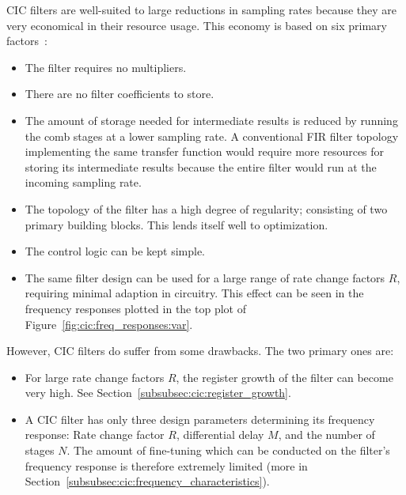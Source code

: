 CIC filters are well-suited to large reductions in sampling rates because they
are very  economical in  their resource  usage. This economy  is based  on six
primary factors~\cite{1163535}:
\begin{itemize}\tightlist
    \item
        The filter requires no multipliers.
    \item
        There are no filter coefficients to store.
    \item
        The amount  of storage needed  for intermediate results is  reduced by
        running the comb  stages at a lower sampling  rate. A conventional FIR
        filter topology implementing the  same transfer function would require
        more resources for storing its intermediate results because the entire
        filter would run at the incoming sampling rate.
    \item
        The  topology  of  the  filter   has  a  high  degree  of  regularity;
        consisting of two  primary building blocks. This lends  itself well to
        optimization.
    \item
        The control logic can be kept simple.
    \item
        The same filter  design can be used  for a large range  of rate change
        factors $R$, requiring minimal  adaption in circuitry. This effect can
        be  seen  in the  frequency  responses  plotted  in  the top  plot  of
        Figure~\ref{fig:cic:freq_responses:var}.
\end{itemize}

However, CIC filters do suffer from some drawbacks. The two primary ones are:
\begin{itemize}\tightlist
    \item
        For large rate  change factors $R$, the register growth  of the filter
        can become very high. See Section~\ref{subsubsec:cic:register_growth}.
    \item
        A   CIC  filter   has   only  three   design  parameters   determining
        its   frequency  response: Rate   change   factor  $R$,   differential
        delay   $M$,    and   the    number   of   stages    $N$. The   amount
        of   fine-tuning   which   can    be   conducted   on   the   filter's
        frequency   response  is   therefore   extremely   limited  (more   in
        Section~\ref{subsubsec:cic:frequency_characteristics}).
\end{itemize}

